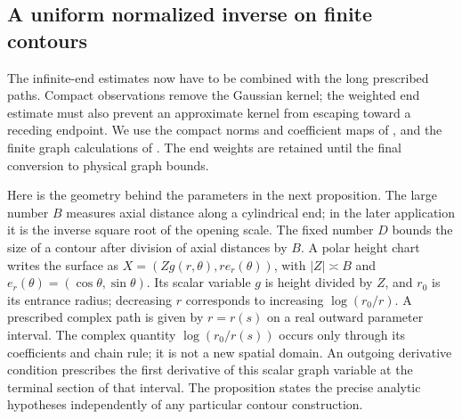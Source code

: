\subsection{A uniform normalized inverse on finite contours}
\label{sec:finite-linear}

The infinite-end estimates now have to be combined with the long
prescribed paths.  Compact observations remove the Gaussian kernel;
the weighted end estimate must also prevent an approximate kernel
from escaping toward a receding endpoint.  We use the compact norms
and coefficient maps of , and the finite graph
calculations of .  The end weights are
retained until the final conversion to physical graph bounds.

Here is the geometry behind the parameters in the next proposition.
The large number $B$ measures axial distance along a cylindrical end;
in the later application it is the inverse square root of the opening
scale.  The fixed number $D$ bounds the size of a contour after division
of axial distances by $B$.  A polar height chart writes the surface as
$X=(Zg(r,\theta),r e_r(\theta))$, with $|Z|\asymp B$ and
$e_r(\theta)=(\cos\theta,\sin\theta)$.  Its scalar variable $g$ is
height divided by $Z$, and $r_0$ is its entrance radius; decreasing $r$
corresponds to increasing $\log(r_0/r)$.  A prescribed complex path is
given by $r=r(s)$ on a real outward parameter interval.  The complex
quantity $\log(r_0/r(s))$ occurs only through its coefficients and
chain rule; it is not a new spatial domain.
An outgoing derivative condition prescribes the first derivative of
this scalar graph variable at the terminal section of that interval.
The proposition states the precise analytic hypotheses independently
of any particular contour construction.

